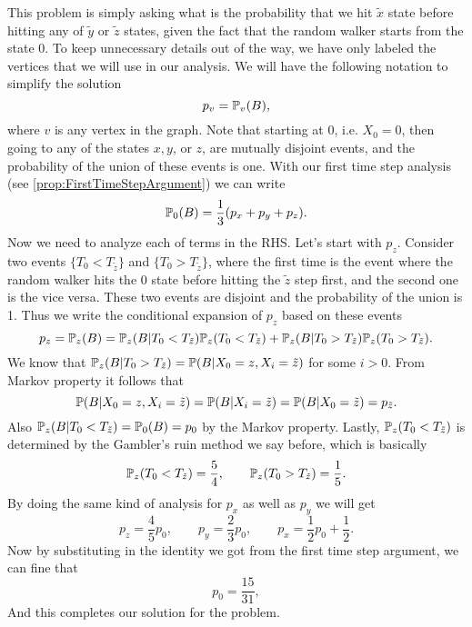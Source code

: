 \begin{example}
	\begin{solution}
		This problem is simply asking what is the probability that we hit $\tilde{x}$ state before hitting any of $\tilde{y}$ or $\tilde{z}$ states, given the fact that the random walker starts from the state $0$. To keep unnecessary details out of the way, we have only labeled the vertices that we will use in our analysis. We will have the following notation to simplify the solution
		\[ p_v = \mathbb{P}_v(B), \]
		where $v$ is any vertex in the graph. Note that starting at 0, i.e. $X_0=0$, then going to any of the states $x,y$, or $z$, are mutually disjoint events, and the probability of the union of these events is one. With our first time step analysis (see \autoref{prop:FirstTimeStepArgument}) we can write
		\[ \mathbb{P}_0(B) = \frac{1}{3} ( p_x + p_y + p_z). \]
		Now we need to analyze each of terms in the RHS. Let's start with $p_z$. Consider two events $\{ T_0 < T_{\tilde{z}}  \}$ and $\{ T_0 > T_{\tilde{z}}  \}$, where the first time is the event where the random walker hits the $0$ state before hitting the $\tilde{z}$ step first, and the second one is the vice versa. These two events are disjoint and the probability of the union is 1. Thus we write the conditional expansion of $p_z$ based on these events
		\[ p_z = \mathbb{P}_z(B) = \mathbb{P}_z(B|T_0 < T_{\tilde{z}})\mathbb{P}_z(T_0 < T_{\tilde{z}}) + \mathbb{P}_z(B|T_0 > T_{\tilde{z}})\mathbb{P}_z(T_0 > T_{\tilde{z}}). \]
		We know that $\mathbb{P}_z(B|T_0 > T_{\tilde{z}}) = \mathbb{P}(B|X_0=z,X_i=\tilde{z})$ for some $i > 0$. From Markov property it follows that 
		\[ \mathbb{P}(B|X_0=z,X_i=\tilde{z}) = \mathbb{P}(B|X_i=\tilde{z}) = \mathbb{P}(B|X_0 = \tilde{z})  = p_{\tilde{z}}.\]
		Also $\mathbb{P}_z(B|T_0<T_{\tilde{z}}) = \mathbb{P}_0(B) = p_0$ by the Markov property. Lastly, $\mathbb{P}_z(T_0<T_{\tilde{z}})$ is determined by the Gambler's ruin method we say before, which is basically
		\[ \mathbb{P}_z(T_0 < T_{\tilde{z}}) = \frac{5}{4}, \qquad \mathbb{P}_z(T_0>T_{\tilde{z}}) = \frac{1}{5}. \]
		By doing the same kind of analysis for $p_x$ as well as $p_y$ we will get
		\[ p_z = \frac{4}{5}p_0 , \qquad p_y = \frac{2}{3}p_0, \qquad p_x =\frac{1}{2}p_0 + \frac{1}{2}. \]
		Now by substituting in the identity we got from the first time step argument, we can fine that 
		\[ p_0 = \frac{15}{31}, \]
		And this completes our solution for the problem.
	\end{solution}
	
\end{example}


